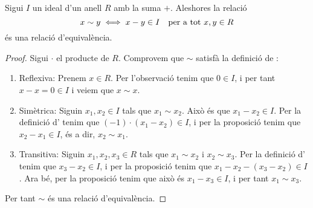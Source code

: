 \documentclass[../../Main.tex]{subfiles}
\begin{document}
	\begin{proposition}
		\label{prop:relació d'equivalència en anells per ideals}
		Sigui \(I\) un ideal d'un anell \(R\) amb la suma \(+\). Aleshores la relació
		\[x\sim y\iff x-y\in I\quad\text{per a tot }x,y\in R\]
		és una relació d'equivalència.
		\begin{proof}
			Sigui \(\cdot\) el producte de \(R\). Comprovem que \(\sim\) satisfà la definició de :
			\begin{enumerate}
				\item Reflexiva: Prenem \(x\in R\). Per l'observació  tenim que \(0\in I\), i per tant \(x-x=0\in I\) i veiem que \(x\sim x\).
				\item Simètrica: Siguin \(x_{1},x_{2}\in I\) tals que \(x_{1}\sim x_{2}\). Això és que \(x_{1}-x_{2}\in I\). Per la definició d' tenim que \((-1)\cdot(x_{1}-x_{2})\in I\), i per la proposició  tenim que \(x_{2}-x_{1}\in I\), és a dir, \(x_{2}\sim x_{1}\).
				\item Transitiva: Siguin \(x_{1},x_{2},x_{3}\in R\) tals que \(x_{1}\sim x_{2}\) i \(x_{2}\sim x_{3}\). Per la definició d' tenim que \(x_{3}-x_{2}\in I\), i per la proposició  tenim que \(x_{1}-x_{2}-(x_{3}-x_{2})\in I\). Ara bé, per la proposició  tenim que això és \(x_{1}-x_{3}\in I\), i per tant \(x_{1}\sim x_{3}\).
			\end{enumerate}
			Per tant \(\sim\) és una relació d'equivalència.
		\end{proof}
	\end{proposition}
\end{document}
